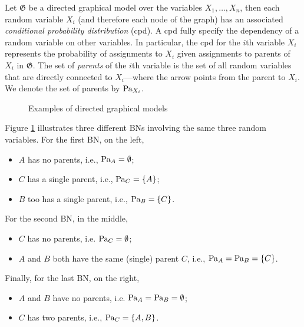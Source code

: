 Let $\mathfrak G$ be a directed graphical model over the variables $X_1, \ldots, X_n$, then each random variable $X_i$ (and therefore each node of the graph)  has an associated \emph{conditional probability distribution} (cpd). A cpd fully specify the dependency of a random variable on other variables.
In particular, the cpd for the $i$th variable $X_i$ represents the probability of assignments to $X_i$ given assignments to parents of $X_i$ in $\mathfrak G$. The set of \emph{parents} of the $i$th variable is the set of all random variables that are directly connected to $X_i$---where the arrow points from the parent to $X_i$. We denote the set of parents by $\mathbf{\text{Pa}}_{X_i}$.  %

\begin{figure}[h]\centering
\caption{\label{fig:BN} Examples of directed graphical models}
\end{figure}

Figure \ref{fig:BN} illustrates three different BNs involving the same three random variables. For the first BN, on the left, 
\begin{itemize}
	\item $A$ has no parents, i.e., $\mathbf{\text{Pa}}_{A} = \emptyset$;
	\item $C$ has a single parent, i.e., $\mathbf{\text{Pa}}_C = \{A\}$;
	\item $B$ too has a single parent, i.e., $\mathbf{\text{Pa}}_B = \{C\}$.
\end{itemize}
For the second BN, in the middle, 
\begin{itemize}
	\item $C$ has no parents, i.e. $\mathbf{\text{Pa}}_C = \emptyset$;
	\item $A$ and $B$ both have the same (single) parent $C$, i.e., $\mathbf{\text{Pa}}_A = \mathbf{\text{Pa}}_B = \{C\}$.
\end{itemize}
Finally, for the last BN, on the right, 
\begin{itemize}
	\item $A$ and $B$ have no parents, i.e. $\mathbf{\text{Pa}}_A = \mathbf{\text{Pa}}_{B} = \emptyset$;
	\item $C$ has two parents, i.e., $\mathbf{\text{Pa}}_C = \{A, B\}$.
\end{itemize}

